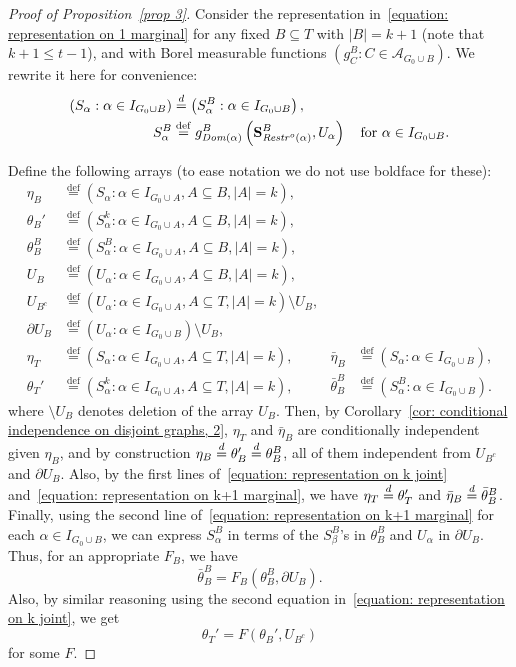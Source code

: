 \documentclass[10pt]{amsart}
\theoremstyle{definition}\newtheorem{defi}[theo]{Definition}\newtheorem{rema}[theo]{Remark}\newtheorem{exam}[theo]{Example}\newtheorem{exem}[theo]{Example}\newtheorem{nota}[theo]{Notation}
\newcommand{\alf}{\alpha}%
\newcommand*\bb{\beta}
\newcommand*{\defeq}{\stackrel{\mathrm{def}}{=}}
\renewcommand{\d}{\buildrel{d}\over{=}}
\newcommand*\srstr{\mathit{Restr}^o}
\newcommand*\dom{\mathit{Dom}}
\renewcommand{\AA}{\mathcal{A}}
\newcommand*\bS{\mathbf{S}}
\begin{document}
\begin{proof}[Proof of Proposition~\ref{prop 3}]
Consider the representation in~\eqref{equation: representation on 1 marginal} for any fixed $B \subseteq T$ with $|B|=k+1$ (note that $k+1\le t-1$), and with Borel measurable functions $(g^B_C:C \in \AA_{G_0 \cup B})$. We rewrite it here for convenience:
\begin{equation}\label{equation: representation on k+1 marginal}
\begin{aligned}
(S_\alf : \alf \in I_{G_0 \cup B}) & \d \left(S^B_\alf : \alf \in I_{G_0 \cup B}\right),
\\
S^B_\alf &
\defeq g^B_{\dom(\alf)}\left(\bS^B_{\srstr(\alf)}, U_\alf\right)\quad\text{for }\alf \in I_{G_0 \cup B}.
\end{aligned}
\end{equation}

Define the following arrays (to ease notation we do not use boldface for these):
\begin{align*}
\eta_B &
\defeq (S_\alf : \alf \in I_{G_0 \cup A}, A \subseteq B, |A|=k),
\\
\theta_B' &
\defeq \left(S^k_\alf : \alf \in I_{G_0 \cup A}, A \subseteq B, |A|=k\right),
\\
\theta_B^B&
\defeq \left(S^B_\alf : \alf \in I_{G_0 \cup A}, A \subseteq B, |A|=k\right),
\\[2ex] U_B &
\defeq(U_\alf : \alf \in I_{G_0 \cup A}, A \subseteq B, |A|=k),
\\
U_{B^c} &
\defeq (U_\alf : \alf \in I_{G_0 \cup A}, A \subseteq T, |A|=k) \setminus U_B,
\\
\partial U_B &
\defeq (U_\alf :\alf \in I_{G_0 \cup B}) \setminus U_B,
\\[2ex]
\eta_T &
\defeq (S_\alf :\alf \in I_{G_0 \cup A}, A \subseteq T, |A|=k), &
\bar\eta_B &
\defeq (S_\alf :\alf \in I_{G_0 \cup B}),
\\
\theta_T' &
\defeq \left(S^k_\alf : \alf \in I_{G_0 \cup A}, A \subseteq T, |A|=k\right), &
\bar\theta^B_B &
\defeq\left(S^B_\alf : \alf \in I_{G_0 \cup B}\right).
\end{align*}
where $\setminus U_B$ denotes deletion of the array $U_B$. Then, by Corollary~\ref{cor: conditional independence on disjoint graphs, 2}, $\eta_T$ and $\bar\eta_B$ are conditionally independent given $\eta_B $, and by construction $\eta_B \d \theta_B' \d \theta_B^B$, all of them independent from $U_{B^c}$ and $\partial U_B$. Also, by the first lines of~\eqref{equation: representation on k joint} and~\eqref{equation: representation on k+1 marginal}, we have $\eta_T \d \theta_T'$ and $\bar\eta_B \d \bar\theta^B_B$. Finally, using the second line of~\eqref{equation: representation on k+1 marginal} for each $\alf \in I_{G_0 \cup B}$, we can express $S^B_\alf$ in terms of the $S^B_\bb$'s in $\theta_B^B$ and $U_\alpha$ in $\partial U_B$. Thus, for an appropriate $F_B$, we have
\[
\bar\theta^B_B=F_B\left(\theta_B^B, \partial U_B\right).
\]
Also, by similar reasoning using the second equation in~\eqref{equation: representation on k joint}, we get
\[
\theta_T'=F(\theta_B', U_{B^c})
\]
for some $F$.


\end{proof}
\end{document}
